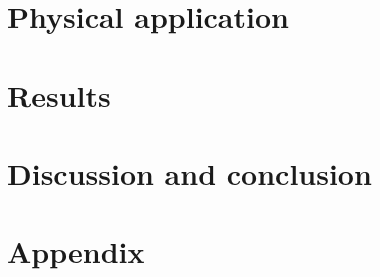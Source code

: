 \documentclass[twoside,english]{uiofysmaster}
\begin{document}
\chapter{Physical application}\label{chapter:application}
\clearpage


\chapter{Results}\label{chapter:results}
\clearpage


\chapter{Discussion and conclusion}\label{chapter:discussion}
\clearpage


\appendix
\chapter{Appendix}\label{chapter:appendix}



\printbibliography
\end{document}
